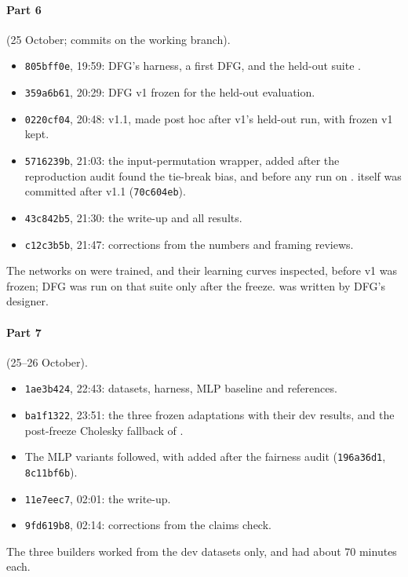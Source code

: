 \paragraph{Part 6} (25 October; commits on the working branch).
\begin{itemize}
\item \texttt{805bff0e}, 19:59: DFG's harness, a first DFG, and the held-out suite .
\item \texttt{359a6b61}, 20:29: DFG v1 frozen for the held-out evaluation.
\item \texttt{0220cf04}, 20:48: v1.1, made post hoc after v1's held-out run, with frozen v1 kept.
\item \texttt{5716239b}, 21:03: the input-permutation wrapper, added after the reproduction audit found the tie-break bias, and before any run on .  itself was committed after v1.1 (\texttt{70c604eb}).
\item \texttt{43c842b5}, 21:30: the write-up and all results.
\item \texttt{c12c3b5b}, 21:47: corrections from the numbers and framing reviews.
\end{itemize}
The networks on  were trained, and their learning curves inspected, before v1 was frozen; DFG was run on that suite only after the freeze.  was written by DFG's designer.

\paragraph{Part 7} (25--26 October).
\begin{itemize}
\item \texttt{1ae3b424}, 22:43: datasets, harness, MLP baseline and references.
\item \texttt{ba1f1322}, 23:51: the three frozen adaptations with their dev results, and the post-freeze Cholesky fallback of .
\item The MLP variants followed, with  added after the fairness audit (\texttt{196a36d1}, \texttt{8c11bf6b}).
\item \texttt{11e7eec7}, 02:01: the write-up.
\item \texttt{9fd619b8}, 02:14: corrections from the claims check.
\end{itemize}
The three builders worked from the dev datasets only, and had about 70 minutes each.

